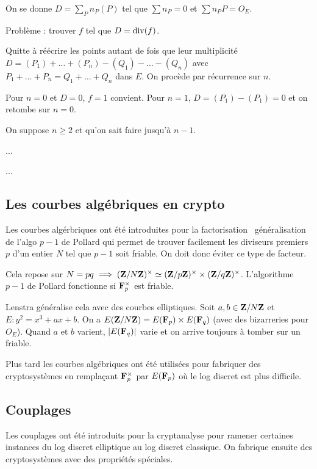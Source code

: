 	On se donne $D = \sum_P n_P(P)$ tel que $\sum n_P = 0$ et $\sum n_P P = O_E$.
	
	Problème : trouver $f$ tel que $D = \operatorname{div}(f)$.
	
	Quitte à réécrire les points autant de fois que leur multiplicité $D = (P_1) + \ldots + (P_n) - (Q_1) - \ldots - (Q_n)$ avec $P_1 + \ldots + P_n = Q_1 + \ldots + Q_n$ dans $E$.
	On procède par récurrence sur $n$.
	
	Pour $n = 0$ et $D = 0$, $f = 1$ convient.
	Pour $n = 1$, $D = (P_1) - (P_1) = 0$ et on retombe sur $n = 0$.
	
	On suppose $n \geq 2$ et qu'on sait faire jusqu'à $n - 1$.
	
	...
	
	...


\subsection{Les courbes algébriques en crypto}

	Les courbes algérbriques ont été introduites pour la factorisation \textrightarrow\ généralisation de l'algo $p - 1$ de Pollard qui permet de trouver facilement les diviseurs premiers $p$ d'un entier $N$ tel que $p - 1$ soit friable.
	On doit donc éviter ce type de facteur.
	
	Cela repose sur $N = pq \implies (\mathbf{Z} / N\mathbf{Z})^\times \simeq (\mathbf{Z} / p\mathbf{Z})^\times \times (\mathbf{Z} / q\mathbf{Z})^\times$.
	L'algorithme $p - 1$ de Pollard fonctionne si $\mathbf{F}_p^\times$ est friable.
	
	Lenstra généralise cela avec des courbes elliptiques.
	Soit $a, b \in \mathbf{Z} / N\mathbf{Z}$ et $E : y^2 = x^3 + ax + b$.
	On a $E(\mathbf{Z} / N\mathbf{Z}) = E(\mathbf{F}_p) \times E(\mathbf{F}_q)$ (avec des bizarreries pour $O_E$).
	Quand $a$ et $b$ varient, $\left\lvert E(\mathbf{F}_q)\right\rvert$ varie et on arrive toujours à tomber sur un friable.
	
	Plus tard les courbes algébriques ont été utilisées pour fabriquer des cryptosystèmes en remplaçant $\mathbf{F}_p^\times$ par $E(\mathbf{F}_p)$ où le log discret est plus difficile.


\subsection{Couplages}

	Les couplages ont été introduits pour la cryptanalyse pour ramener certaines instances du log discret elliptique au log discret classique.
	On fabrique ensuite des cryptosystèmes avec des propriétés spéciales.
	
